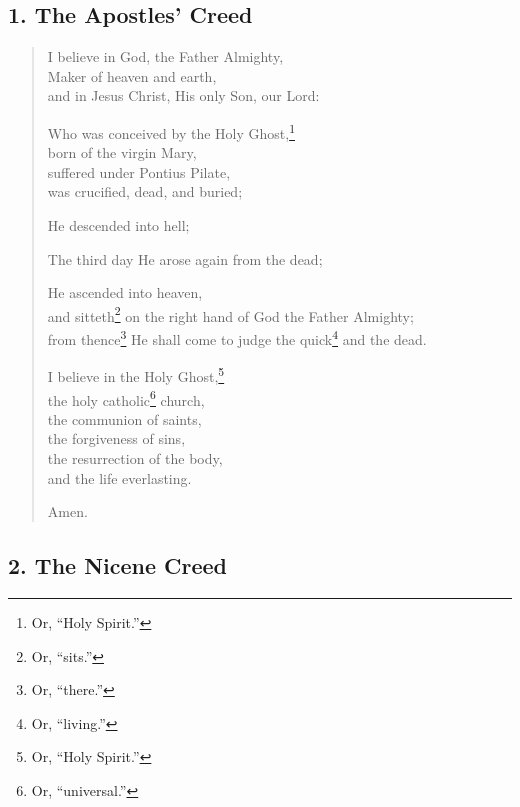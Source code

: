 \documentclass[
]{book}
\begin{document}
\protect\hypertarget{chapter-slug-80-the-creeds}{\href{}{}}
\protect\hypertarget{80}{\href{}{}}

\hypertarget{the-apostles-creed}{%
\subsection*{\texorpdfstring{1. \textbf{The Apostles' Creed}}{1. The Apostles' Creed}}\label{the-apostles-creed}}

\begin{quote}
I believe in God, the Father Almighty,\\
Maker of heaven and earth,\\
and in Jesus Christ, His only Son, our Lord:

Who was conceived by the Holy Ghost,\footnote{Or, ``Holy Spirit.''}\\
born of the virgin Mary,\\
suffered under Pontius Pilate,\\
was crucified, dead, and buried;

He descended into hell;

The third day He arose again from the dead;

He ascended into heaven,\\
and sitteth\footnote{Or, ``sits.''} on the right hand of God the Father Almighty;\\
from thence\footnote{Or, ``there.''} He shall come to judge the quick\footnote{Or, ``living.''} and the dead.

I believe in the Holy Ghost,\footnote{Or, ``Holy Spirit.''}\\
the holy catholic\footnote{Or, ``universal.''} church,\\
the communion of saints,\\
the forgiveness of sins,\\
the resurrection of the body,\\
and the life everlasting.

Amen.
\end{quote}

\hypertarget{the-nicene-creed}{%
\subsection*{\texorpdfstring{2. \textbf{The Nicene Creed}}{2. The Nicene Creed}}\label{the-nicene-creed}}
\end{document}
